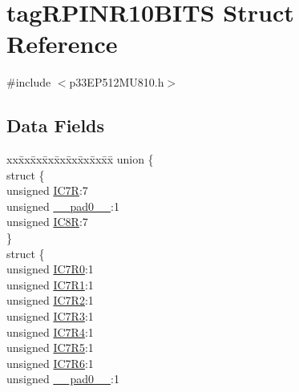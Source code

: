 \hypertarget{structtag_r_p_i_n_r10_b_i_t_s}{}\section{tag\+R\+P\+I\+N\+R10\+B\+I\+TS Struct Reference}
\label{structtag_r_p_i_n_r10_b_i_t_s}


{\ttfamily \#include $<$p33\+E\+P512\+M\+U810.\+h$>$}

\subsection*{Data Fields}
\begin{DoxyCompactItemize}
\item 
\begin{tabbing}
xx\=xx\=xx\=xx\=xx\=xx\=xx\=xx\=xx\=\kill
union \{\\
\>struct \{\\
\>\>unsigned \hyperlink{structtag_r_p_i_n_r10_b_i_t_s_a3b15aa39889238624e5fa7ca0ab057ae}{IC7R}:7\\
\>\>unsigned \hyperlink{structtag_r_p_i_n_r10_b_i_t_s_adf71f3d8410c1f1dbbc96680a92c49af}{\_\_pad0\_\_}:1\\
\>\>unsigned \hyperlink{structtag_r_p_i_n_r10_b_i_t_s_aa9596f722f705b847cd5d69b73184687}{IC8R}:7\\
\>\} \\
\>struct \{\\
\>\>unsigned \hyperlink{structtag_r_p_i_n_r10_b_i_t_s_a5d0b91352e6b5a5b4426dcc8a3ba12ec}{IC7R0}:1\\
\>\>unsigned \hyperlink{structtag_r_p_i_n_r10_b_i_t_s_afa8c94f16d0f3f2422dc859011cffa59}{IC7R1}:1\\
\>\>unsigned \hyperlink{structtag_r_p_i_n_r10_b_i_t_s_a70d436e4d2a265378302acb819f3095d}{IC7R2}:1\\
\>\>unsigned \hyperlink{structtag_r_p_i_n_r10_b_i_t_s_ad85db2ba12b86bcf02eab89967b02984}{IC7R3}:1\\
\>\>unsigned \hyperlink{structtag_r_p_i_n_r10_b_i_t_s_a47c8672bb8f367853941eee96ca1b392}{IC7R4}:1\\
\>\>unsigned \hyperlink{structtag_r_p_i_n_r10_b_i_t_s_acb919e67e09073dc3229e8b980fa6f04}{IC7R5}:1\\
\>\>unsigned \hyperlink{structtag_r_p_i_n_r10_b_i_t_s_af0e70a55488803120f9443bbd357ba5a}{IC7R6}:1\\
\>\>unsigned \hyperlink{structtag_r_p_i_n_r10_b_i_t_s_adf71f3d8410c1f1dbbc96680a92c49af}{\_\_pad0\_\_}:1\\

\end{tabbing}
\end{DoxyCompactItemize}
